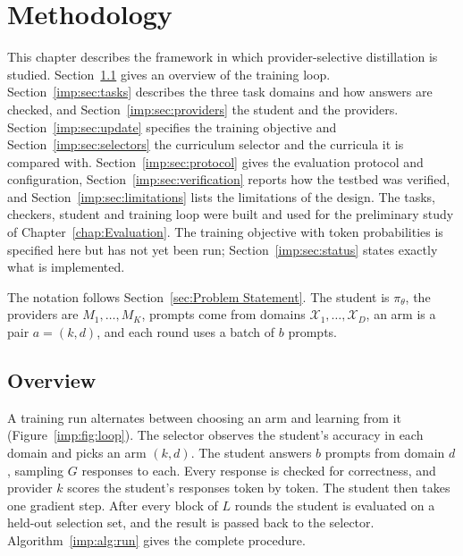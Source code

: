 \chapter{Methodology}
\label{chap:Implementation}

\providecommand{\TBD}[1][]{\textcolor{red}{[TBD\if\relax\detokenize{#1}\relax\else: #1\fi]}}

This chapter describes the framework in which provider-selective distillation is
studied. Section~\ref{imp:sec:overview} gives an overview of the training loop.
Section~\ref{imp:sec:tasks} describes the three task domains and how answers are
checked, and Section~\ref{imp:sec:providers} the student and the providers.
Section~\ref{imp:sec:update} specifies the training objective and
Section~\ref{imp:sec:selectors} the curriculum selector and the curricula it is
compared with. Section~\ref{imp:sec:protocol} gives the evaluation protocol and
configuration, Section~\ref{imp:sec:verification} reports how the testbed was verified,
and Section~\ref{imp:sec:limitations} lists the limitations of the design. The tasks,
checkers, student and training loop were built and used for the preliminary study of
Chapter~\ref{chap:Evaluation}. The training objective with token probabilities is
specified here but has not yet been run; Section~\ref{imp:sec:status} states exactly
what is implemented.

The notation follows Section~\ref{sec:Problem Statement}. The student is $\pi_\theta$,
the providers are $M_1, \dots, M_K$, prompts come from domains
$\mathcal{X}_1, \dots, \mathcal{X}_D$, an arm is a pair $a = (k, d)$, and each round
uses a batch of $b$ prompts.

\section{Overview}
\label{imp:sec:overview}

A training run alternates between choosing an arm and learning from it
(Figure~\ref{imp:fig:loop}). The selector observes the student's accuracy in each
domain and picks an arm $(k, d)$. The student answers $b$ prompts from domain $d$,
sampling $G$ responses to each. Every response is checked for correctness, and
provider $k$ scores the student's responses token by token. The student then takes one
gradient step. After every block of $L$ rounds the student is evaluated on a held-out
selection set, and the result is passed back to the selector.
Algorithm~\ref{imp:alg:run} gives the complete procedure.

